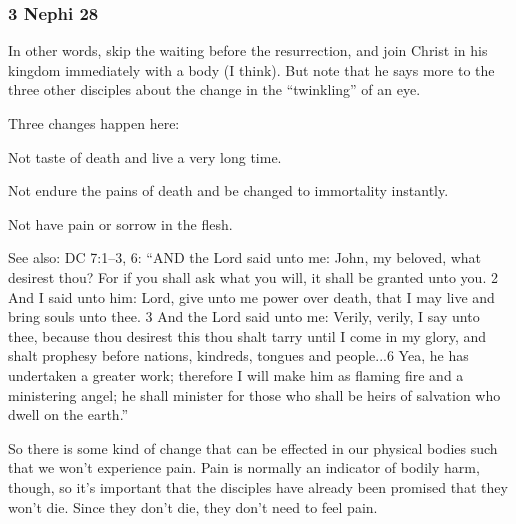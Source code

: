 	\subsubsection{3 Nephi 28} %
	
		\begin{compactdesc}
		
		\item[2$\vert$]
		\begin{compactdesc}
		\item[that we may speedily come unto thee] In other words, skip the waiting before the resurrection, and join Christ in his kingdom immediately with a body (I think). But note that he says more to the three other disciples about the change in the ``twinkling'' of an eye.
		\end{compactdesc}
		
		\item[7--9$\vert$]
		\begin{compactdesc}
		\item[Changes in the body to live longer] Three changes happen here:
			\begin{compactitem}
			\item Not taste of death and live a very long time.
			\item Not endure the pains of death and be changed to immortality instantly.
			\item Not have pain or sorrow in the flesh.
			\end{compactitem}
				See also:
					DC 7:1--3, 6: ``AND the Lord said unto me: John, my beloved, what desirest thou? For if you shall ask what you will, it shall be granted unto you. 2 And I said unto him: Lord, give unto me power over death, that I may live and bring souls unto thee. 3 And the Lord said unto me: Verily, verily, I say unto thee, because thou desirest this thou shalt tarry until I come in my glory, and shalt prophesy before nations, kindreds, tongues and people...6 Yea, he has undertaken a greater work; therefore I will make him as flaming fire and a ministering angel; he shall minister for those who shall be heirs of salvation who dwell on the earth.''
		\end{compactdesc}
		
		\item[9$\vert$]
		\begin{compactdesc}
		\item[shall not have pain] So there is some kind of change that can be effected in our physical bodies such that we won't experience pain. Pain is normally an indicator of bodily harm, though, so it's important that the disciples have already been promised that they won't die. Since they don't die, they don't need to feel pain. 
		\end{compactdesc} 
		
		\end{compactdesc}
		
